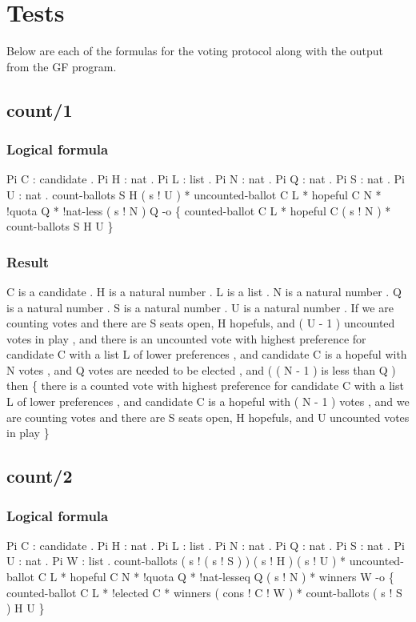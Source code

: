 \chapter{Tests}
\label{A_05}

Below are each of the formulas for the voting protocol along with the output from the GF program.

\section{count/1}
\subsection{Logical formula}
\begin{texto2}
	Pi C : candidate . Pi H : nat . Pi L : list . Pi N : nat . Pi Q : nat . Pi S : nat . Pi U : nat . count-ballots S H ( s ! U ) * uncounted-ballot C L * hopeful C N * !quota Q * !nat-less ( s ! N ) Q -o \{ counted-ballot C L * hopeful C ( s ! N ) * count-ballots S H U \}
\end{texto2}

\subsection{Result}
\begin{texto2}
	C is a candidate . H is a natural number . L is a list . N is a natural number . Q is a natural number . S is a natural number . U is a natural number . If we are counting votes and there are S seats open, H hopefuls, and ( U - 1 ) uncounted votes in play , and there is an uncounted vote with highest preference for candidate C with a list L of lower preferences , and candidate C is a hopeful with N votes , and Q votes are needed to be elected , and ( ( N - 1 ) is less than Q ) then \{ there is a counted vote with highest preference for candidate C with a list L of lower preferences , and candidate C is a hopeful with ( N - 1 ) votes , and we are counting votes and there are S seats open, H hopefuls, and U uncounted votes in play \}
\end{texto2}

\section{count/2}
\subsection{Logical formula}
\begin{texto2}
	Pi C : candidate . Pi H : nat . Pi L : list . Pi N : nat . Pi Q : nat . Pi S : nat . Pi U : nat . Pi W : list . count-ballots ( s ! ( s ! S ) ) ( s ! H ) ( s ! U ) * uncounted-ballot C L * hopeful C N * !quota Q * !nat-lesseq Q ( s ! N ) * winners W -o \{ counted-ballot C L * !elected C * winners ( cons ! C ! W ) * count-ballots ( s ! S ) H U \}
\end{texto2}

